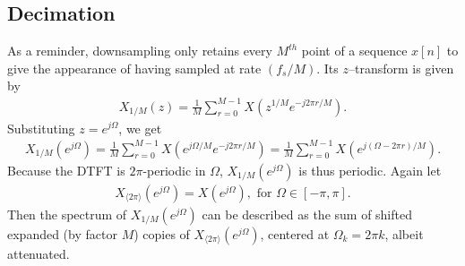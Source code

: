 \documentclass{report}
\begin{document}
\subsection{Decimation}
As a reminder, downsampling only retains every $M^{th}$ point of a sequence $x[n]$ to give the appearance of having sampled at rate $(f_s/M)$. Its $z$--transform is 
given by
\begin{align}
    X_{1/M}(z) = \frac{1}{M} \sum_{r=0}^{M-1} X\left(z^{1/M}e^{-j2\pi r/M}\right).
\end{align}
Substituting $z=e^{j\Omega}$, we get 
\begin{align}
    X_{1/M}(e^{j\Omega}) = \frac{1}{M} \sum_{r=0}^{M-1} X\left(e^{j\Omega/M}e^{-j2\pi r/M}\right) = \frac{1}{M} \sum_{r=0}^{M-1} X\left(e^{j(\Omega-2\pi r)/M}\right).
\end{align}
Because the DTFT is $2\pi$-periodic in $\Omega$, $X_{1/M}(e^{j\Omega})$ is thus periodic. Again let 
\begin{align}
    X_{\langle2\pi\rangle}(e^{j\Omega}) = X(e^{j\Omega}), \text{ for } \Omega\in[-\pi,\pi].
\end{align}
Then the spectrum of $X_{1/M}(e^{j\Omega})$ can be described as the sum of shifted 
expanded (by factor $M$) copies of $X_{\langle2\pi\rangle}(e^{j\Omega})$, centered at $\Omega_k = 2\pi k$, albeit attenuated.
\end{document}
